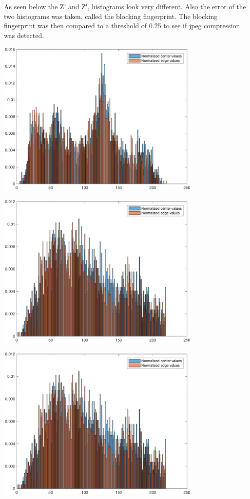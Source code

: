 \documentclass{article}
\begin{document}
As seen below the Z' and Z\'', histograms look very different. Also
the error of the two histograms was taken, called the blocking fingerprint.
The blocking fingerprint was then compared to a threshold of
0.25 to see if jpeg compression was detected.
    
\includegraphics [width=4in]{lab4_01.eps}

\includegraphics [width=4in]{lab4_02.eps}

\includegraphics [width=4in]{lab4_03.eps}
\end{document}
